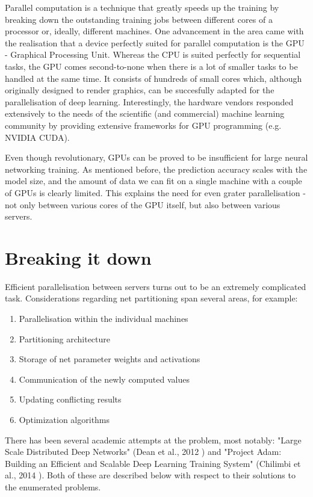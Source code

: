 \documentclass[a4paper, 11pt]{article}
\numberwithin{equation}{section}
\begin{document}
	Parallel computation is a technique that greatly speeds up the training by breaking down the outstanding training jobs between different cores of a processor or, ideally, different machines. One advancement in the area came with the realisation that a device perfectly suited for parallel computation is the GPU - Graphical Processing Unit. Whereas the CPU is suited perfectly for sequential tasks, the GPU comes second-to-none when there is a lot of smaller tasks to be handled at the same time. It consists of hundreds of small cores which, although originally designed to render graphics, can be succesfully adapted for the parallelisation of deep learning. Interestingly, the hardware vendors responded extensively to the needs of the scientific (and commercial) machine learning community by providing extensive frameworks for GPU programming (e.g. NVIDIA CUDA).
	
	Even though revolutionary, GPUs can be proved to be insufficient for large neural networking training. As mentioned before, the prediction accuracy scales with the model size, and the amount of data we can fit on a single machine with a couple of GPUs is clearly limited. This explains the need for even grater parallelisation - not only between various cores of the GPU itself, but also between various servers. 
	
	\section{Breaking it down}
	\label{breakingitdown}
	
	Efficient parallelisation between servers turns out to be an extremely complicated task. Considerations regarding net partitioning span several areas, for example:
	\begin{enumerate}
		\item Parallelisation within the individual machines
		\item Partitioning architecture
		\item Storage of net parameter weights and activations
		\item Communication of the newly computed values
		\item Updating conflicting results
		\item Optimization algorithms
	\end{enumerate}
	
	There has been several academic attempts at the problem, most notably: "Large Scale Distributed Deep Networks" (Dean et al., 2012 \cite{dean2012large}) and "Project Adam: Building an Efficient and Scalable Deep Learning Training System" (Chilimbi et al., 2014 \cite{chilimbi2014project}). Both of these are described below with respect to their solutions to the enumerated problems.
	
\end{document}

